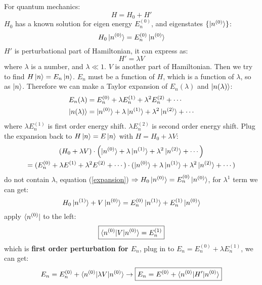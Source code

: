 \documentclass[UTF8,12pt]{article} %
\begin{document}
For quantum mechanics:
\begin{equation}
    H=H_{0} + H'
\end{equation}
$H_0$ has a known solution for eigen energy $E^{(0)}_{n}$, and eigenstates $\{\ket{n^{(0)}}\}$:
\begin{equation}
    H_0\ket{n^{(0)}}=E^{(0)}_n\ket{n^{(0)}}
\end{equation}
$H'$ is perturbational part of Hamiltonian, it can express as:
\begin{equation}
    H'=\lambda V
\end{equation}
where $\lambda$ is a number, and $\lambda\ll1$. $V$ is another part of Hamiltonian. Then we try to find $H\ket{n} = E_{n}\ket{n}$. $E_{n}$ must be a function of $H$, which is a function of $\lambda$, so as $\ket{n}$. Therefore we can make a Taylor expansion of $E_{n}(\lambda)$ and $\ket{n(\lambda)}$:
\begin{align}
E_n(\lambda) &= E_n^{(0)}+\lambda E^{(1)}_n+\lambda^2 E^{(2)}_n+\cdots \\ 
\ket{n(\lambda)} &= \ket{n^{(0)}}+\lambda \ket{n^{(1)}}+\lambda^2 \ket{n^{(2)}}+\cdots
\end{align}
where $\lambda E^{(1)}_{n}$ is first order energy shift. $\lambda E^{(2)}_n$ is second order energy shift. Plug the expansion back to $H\ket{n}=E\ket{n}$ with $H=H_0+\lambda V$:
\begin{multline}
(H_0+\lambda V) \cdot \left(\ket{n^{(0)}}+\lambda \ket{n^{(1)}}+\lambda^2\ket{n^{(2)}}+\cdots\right) \\
= (E^{(0)}_n+\lambda E^{(1)}+\lambda^2E^{(2)}+\cdots)\cdot (\ket{n^{(0)}}+\lambda \ket{n^{(1)}}+\lambda^2\ket{n^{(2)}}+\cdots)
\label{expansion}
\end{multline}
do not contain $\lambda$, equation (\ref{expansion}) $\Rightarrow H_0\ket{n^{(0)}}=E^{(0)}_n\ket{n^{(0)}}$, for $\lambda^{1}$ term we can get:
\begin{equation}
H_{0} \ket{n^{(1)}}+V\ket{n^{(0)}}=E^{(0)}_n\ket{n^{(1)}}+E^{(1)}_n\ket{n^{(0)}}
\label{order1}
\end{equation}
apply $\bra{n^{(0)}}$ to the left:
\begin{equation}
\boxed{ \braket{n^{(0)}|V|n^{(0)}} = E^{(1)}_{n}}  
\label{e1}
\end{equation}
which is \textbf{first order perturbation for $E_{n}$}, plug in to $E_{n} = E^{(0)}_{n} + \lambda E^{(1)}_{n}$, we can get:
\begin{equation}
    \begin{aligned}
        E_n= E^{(0)}_n+ \braket{n^{(0)}|\lambda V|n^{(0)}} \to \boxed {E_n=E^{(0)}+\braket{n^{(0)}|H'|n^{(0)}}}
    \end{aligned}    
\end{equation}
\end{document}
